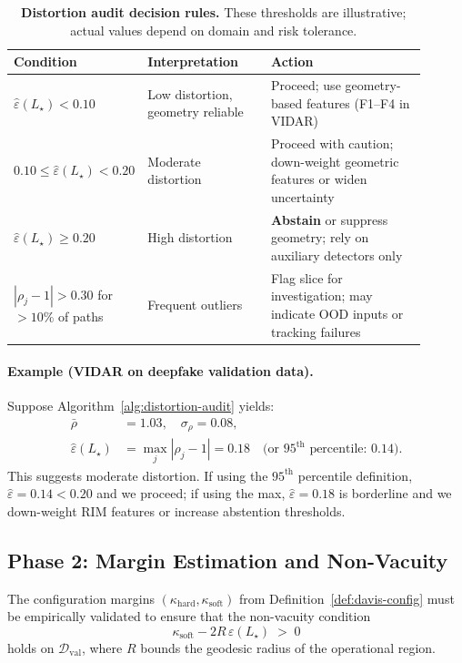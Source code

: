 \documentclass[11pt]{article}
\begin{document}
\begin{table}[H]
\centering
\caption{\textbf{Distortion audit decision rules.} These thresholds are illustrative; actual values depend on domain and risk tolerance.}
\label{tab:distortion-gates}
\begin{tabularx}{\linewidth}{@{}p{0.22\linewidth}p{0.30\linewidth}p{0.38\linewidth}@{}}
\toprule
\textbf{Condition} & \textbf{Interpretation} & \textbf{Action} \\
\midrule
$\hat\varepsilon(L_\star) < 0.10$ & Low distortion, geometry reliable & Proceed; use geometry-based features (F1--F4 in VIDAR) \\
\addlinespace[2pt]
$0.10 \le \hat\varepsilon(L_\star) < 0.20$ & Moderate distortion & Proceed with caution; down-weight geometric features or widen uncertainty \\
\addlinespace[2pt]
$\hat\varepsilon(L_\star) \ge 0.20$ & High distortion & \textbf{Abstain} or suppress geometry; rely on auxiliary detectors only \\
\addlinespace[2pt]
$|\rho_j - 1| > 0.30$ for $>10\%$ of paths & Frequent outliers & Flag slice for investigation; may indicate OOD inputs or tracking failures \\
\bottomrule
\end{tabularx}
\end{table}

\paragraph{Example (VIDAR on deepfake validation data).}
Suppose Algorithm~\ref{alg:distortion-audit} yields:
\begin{align*}
\bar\rho &= 1.03, \quad \sigma_\rho = 0.08, \\
\hat\varepsilon(L_\star) &= \max_j |\rho_j - 1| = 0.18 \quad \text{(or }95^{\text{th}}\text{ percentile: }0.14\text{)}.
\end{align*}
This suggests moderate distortion. If using the $95^{\text{th}}$ percentile definition, $\hat\varepsilon = 0.14 < 0.20$ and we proceed; if using the max, $\hat\varepsilon = 0.18$ is borderline and we down-weight RIM features or increase abstention thresholds.

\subsection{Phase 2: Margin Estimation and Non-Vacuity}
\label{subsec:margin-estimation}

The configuration margins $(\kappa_{\mathrm{hard}}, \kappa_{\mathrm{soft}})$ from Definition~\ref{def:davis-config} must be empirically validated to ensure that the non-vacuity condition
\[
\kappa_{\mathrm{soft}} - 2R\,\varepsilon(L_\star) \;>\; 0
\]
holds on $\mathcal{D}_{\mathrm{val}}$, where $R$ bounds the geodesic radius of the operational region.
\end{document}
